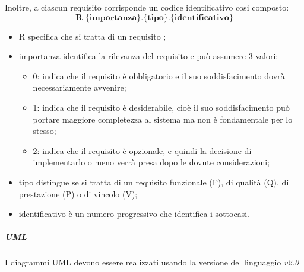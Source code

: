 Inoltre, a ciascun requisito corrisponde un codice identificativo cosi composto:
$$ \textbf{R \{importanza\}.\{tipo\}.\{identificativo\}  } $$
\begin{itemize}
	\item R specifica che si tratta di un requisito ;
	\item importanza identifica la rilevanza del requisito e può assumere 3 valori:
	\begin{itemize}
		\item 0: indica che il requisito è obbligatorio e il suo soddisfacimento dovrà necessariamente avvenire;
		\item 1: indica che il requisito è desiderabile, cioè il suo soddisfacimento può portare maggiore completezza al sistema ma non è fondamentale per lo stesso;
		\item 2: indica che il requisito è opzionale, e quindi la decisione di implementarlo o meno verrà presa dopo le dovute considerazioni;
	\end{itemize}
	\item tipo distingue se si tratta di un requisito funzionale (F), di qualità (Q), di prestazione (P) o di vincolo (V);
	\item identificativo è un numero progressivo che identifica i sottocasi.
\end{itemize}
\subparagraph{UML}\Spazio
I diagrammi UML devono essere realizzati usando la versione del linguaggio \emph{v2.0}

